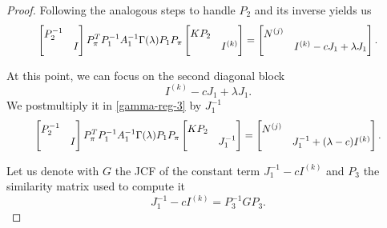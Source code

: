 \begin{proof}
    Following the analogous steps to handle \(P_{2}\) and its inverse yields us
    \begin{gather}
        \scalemath{0.92}{
            \begin{bmatrix}
                P_{2}^{-1} & \\
                & I
            \end{bmatrix}
            P_{\pi}^T P_{1}^{-1} A_{1}^{-1} \Gamma(\lambda) P_{1} P_{\pi}
            \begin{bmatrix}
                KP_{2} & \\
                & I^{(k)}
            \end{bmatrix} =
            \begin{bmatrix}
                N^{(j)} & \\
                & I^{(k)} - cJ_{1} + \lambda J_{1} 
            \end{bmatrix}. \label{gamma-reg-3}
        }
    \end{gather}

    At this point, we can focus on the second diagonal block
    \[
        I^{(k)} - cJ_{1} + \lambda J_{1}.
    \]
    We postmultiply it in
    \eqref{gamma-reg-3} by \(J_{1}^{-1}\)
    \begin{gather}
        \scalemath{0.92}{
            \begin{bmatrix}
                P_{2}^{-1} & \\
                & I
            \end{bmatrix}
            P_{\pi}^T P_{1}^{-1} A_{1}^{-1} \Gamma(\lambda) P_{1} P_{\pi}
            \begin{bmatrix}
                KP_{2} & \\
                & J_{1}^{-1}
            \end{bmatrix} =
            \begin{bmatrix}
                N^{(j)} & \\
                & J_{1}^{-1} + (\lambda - c)I^{(k)} 
            \end{bmatrix}.
        }
    \end{gather}

    Let us denote with \(G\) the JCF of the constant term \(J_{1}^{-1} - cI^{(k)}\) and \(P_{3}\) the similarity matrix
    used to compute it
    \[
        J_{1}^{-1} - cI^{(k)} = P_{3}^{-1}GP_{3}.
    \]


\end{proof}

